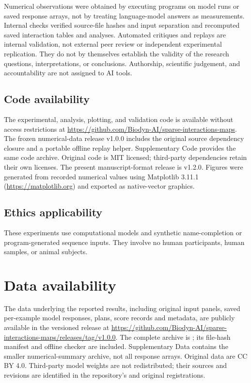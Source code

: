 \documentclass[11pt,letterpaper]{article}
\begin{document}
Numerical observations were obtained by executing programs on model runs or
saved response arrays, not by treating language-model answers as measurements.
Internal checks verified source-file hashes and input separation and
recomputed saved interaction tables and analyses. Automated critiques and
replays are internal validation, not external peer review or independent
experimental replication. They do not by themselves establish the validity
of the research questions, interpretations, or conclusions. Authorship,
scientific judgement, and accountability are not assigned to AI tools.



\subsection*{Code availability}
The experimental, analysis, plotting, and validation code is available without
access restrictions at \url{https://github.com/Biodyn-AI/sparse-interactions-maps}.
The frozen numerical-data release v1.0.0 includes the original source dependency
closure and a portable offline replay helper. Supplementary Code provides the
same code archive. Original code is MIT licensed; third-party dependencies
retain their own licenses. The present manuscript-format release is v1.2.0.
Figures were generated from recorded numerical values using Matplotlib 3.11.1
(\url{https://matplotlib.org}) and exported as native-vector graphics.

\subsection*{Ethics applicability}
These experiments use computational models and synthetic name-completion or
program-generated sequence inputs. They involve no human participants, human
samples, or animal subjects.

\section*{Data availability}
The data underlying the reported results, including original input panels, saved per-example model responses, plans, score records and metadata, are publicly available in the versioned release at \url{https://github.com/Biodyn-AI/sparse-interactions-maps/releases/tag/v1.0.0}. The complete archive is ; its file-hash manifest and offline checker are included. Supplementary Data contains the smaller numerical-summary archive, not all response arrays. Original data are CC BY 4.0. Third-party model weights are not redistributed; their sources and revisions are identified in the repository's  and original registrations.
\end{document}
